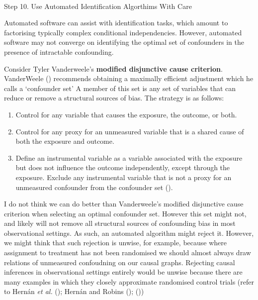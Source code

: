 \documentclass[
  single column]{article}
\makeatletter
\let\oldparagraph\paragraph
\renewcommand{\paragraph}{
    \@ifstar
      \xxxParagraphStar
      \xxxParagraphNoStar
  }
\newcommand{\xxxParagraphStar}[1]{\oldparagraph*{#1}\mbox{}}
\newcommand{\xxxParagraphNoStar}[1]{\oldparagraph{#1}\mbox{}}
\providecommand{\tightlist}{%
  \setlength{\itemsep}{0pt}\setlength{\parskip}{0pt}}\usepackage{longtable,booktabs,array}
\makeatother
\begin{document}
\paragraph{Step 10. Use Automated Identification Algorthims With
Care}\label{step-10.-use-automated-identification-algorthims-with-care}

Automated software can assist with identification tasks, which amount to
factorising typically complex conditional independencies. However,
automated software may not converge on identifying the optimal set of
confounders in the presence of intractable confounding.

Consider Tyler Vanderweele's \textbf{modified disjunctive cause
criterion}. VanderWeele ()
recommends obtaining a maximally efficient adjustment which he calls a
`confounder set' A member of this set is any set of variables that can
reduce or remove a structural sources of bias. The strategy is as
follows:

\begin{enumerate}
\def\labelenumi{\alph{enumi}.}
\tightlist
\item
  Control for any variable that causes the exposure, the outcome, or
  both.
\item
  Control for any proxy for an unmeasured variable that is a shared
  cause of both the exposure and outcome.
\item
  Define an instrumental variable as a variable associated with the
  exposure but does not influence the outcome independently, except
  through the exposure. Exclude any instrumental variable that is not a
  proxy for an unmeasured confounder from the confounder set
  ().
\end{enumerate}

I do not think we can do better than Vanderweele's modified disjunctive
cause criterion when selecting an optimal confounder set. However this
set might not, and likely will not remove all structural sources of
confounding bias in most observational settings. As such, an automated
algorithm might reject it. However, we might think that such rejection
is unwise, for example, because where assignment to treatment has not
been randomised we should almost always draw relations of unmeasured
confoudning on our causal graphs. Rejecting causal inferences in
observational settings entirely would be unwise because there are many
examples in which they closely approximate randomised control trials
(refer to Hernán \emph{et al.} ();
Hernán and Robins ();
())
\end{document}
